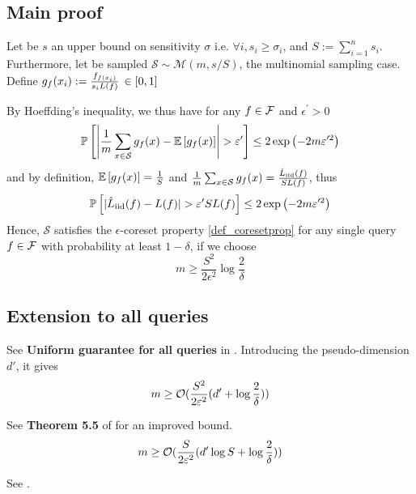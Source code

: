 \subsection{Main proof}
Let be $s$ an upper bound on sensitivity $\sigma$ i.e. $\forall i, s_i \geq \sigma_i$, and $S := \sum_{i=1}^n s_i$. Furthermore, let be sampled  $\mathcal S \sim \mathcal M(m, s/S)$, the multinomial sampling case. Define $g_f(x_i) :=  \frac{f_{f(x_i)}}{s_i L(f)}  \, \in[0,1]$

By Hoeffding's inequality, we thus have for any $f \in \mathcal{F}$ and $\epsilon^{\prime}>0$
\begin{equation}
	\mathbb{P}\left[\left|\frac{1}{m} \sum_{x \in \mathcal{S}} g_{\query}(x) - \mathbb{E}\left[g_{\query}(x)\right]\right|>\epsilon^{\prime}\right] \leq 2 \exp \left(-2 m \epsilon^{\prime 2}\right)
\end{equation}
and by definition, $\mathbb{E}\left[g_{f}(x)\right]=\frac{1}{S}$ and $\frac{1}{m} \sum_{x \in \mathcal{S}} g_{f}(x)=\frac{\hat L_{\textrm{iid}}(f)}{S L(f)}$, thus
\begin{equation*}
	\mathbb{P}\left[|\hat L_{\textrm{iid}}(\query) - L(\query)|>\epsilon^{\prime} S L(\query)\right] \leq 2 \exp \left(-2 m \epsilon^{\prime 2}\right)
\end{equation*}
Hence, $\mathcal{S}$ satisfies the $\epsilon$-coreset property \ref{def_coresetprop} for any single query $f \in \mathcal{F}$ with probability at least $1-\delta$, if we choose
\begin{equation}
	m \geq \frac{S^{2}}{2 \epsilon^{2}} \log \frac{2}{\delta}
\end{equation}


\subsection{Extension to all queries}
See \textbf{Uniform guarantee for all queries} in \cite{bachem2017coresetML}. Introducing the pseudo-dimension $d'$, it gives
\begin{equation}
	m \geq \mathcal{O}(\frac{S^{2}}{2 \varepsilon^{2}} (d' + \log \frac{2}{\delta}))
\end{equation}

See \textbf{Theorem 5.5} of \cite{braverman2016coresetsota} for an improved bound.
\begin{equation}
	m \geq \mathcal{O}(\frac{S}{2 \varepsilon^{2}} (d' \log S + \log \frac{2}{\delta}))
\end{equation}

See \cite{bachem2017coresetML}.
